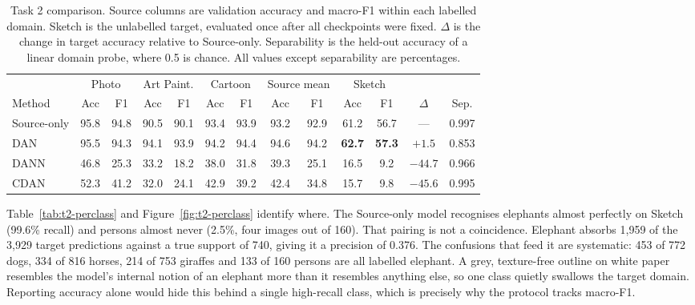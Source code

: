 \begin{table}[t]
\centering
\caption{Task 2 comparison. Source columns are validation accuracy and macro-F1
within each labelled domain. Sketch is the unlabelled target, evaluated once
after all checkpoints were fixed. $\Delta$ is the change in target accuracy
relative to Source-only. Separability is the held-out accuracy of a linear domain
probe, where 0.5 is chance. All values except separability are percentages.}
\label{tab:t2-main}
\small
\setlength{\tabcolsep}{4pt}
\begin{tabular}{lcccccccccccc}
\toprule
& \multicolumn{2}{c}{Photo} & \multicolumn{2}{c}{Art Paint.} & \multicolumn{2}{c}{Cartoon}
& \multicolumn{2}{c}{Source mean} & \multicolumn{2}{c}{Sketch} & &  \\
\cmidrule(lr){2-3}\cmidrule(lr){4-5}\cmidrule(lr){6-7}\cmidrule(lr){8-9}\cmidrule(lr){10-11}
Method & Acc & F1 & Acc & F1 & Acc & F1 & Acc & F1 & Acc & F1 & $\Delta$ & Sep. \\
\midrule
Source-only & 95.8 & 94.8 & 90.5 & 90.1 & 93.4 & 93.9 & 93.2 & 92.9 & 61.2 & 56.7 & --- & 0.997 \\
DAN         & 95.5 & 94.3 & 94.1 & 93.9 & 94.2 & 94.4 & 94.6 & 94.2 & \textbf{62.7} & \textbf{57.3} & $+1.5$ & 0.853 \\
DANN        & 46.8 & 25.3 & 33.2 & 18.2 & 38.0 & 31.8 & 39.3 & 25.1 & 16.5 & 9.2 & $-44.7$ & 0.966 \\
CDAN        & 52.3 & 41.2 & 32.0 & 24.1 & 42.9 & 39.2 & 42.4 & 34.8 & 15.7 & 9.8 & $-45.6$ & 0.995 \\
\bottomrule
\end{tabular}
\end{table}

Table~\ref{tab:t2-perclass} and Figure~\ref{fig:t2-perclass} identify where.
The Source-only model recognises elephants almost perfectly on Sketch (99.6\%
recall) and persons almost never (2.5\%, four images out of 160). That pairing is
not a coincidence. Elephant absorbs 1{,}959 of the 3{,}929 target predictions
against a true support of 740, giving it a precision of 0.376. The confusions
that feed it are systematic: 453 of 772 dogs, 334 of 816 horses, 214 of 753
giraffes and 133 of 160 persons are all labelled elephant. A grey, texture-free
outline on white paper resembles the model's internal notion of an elephant more
than it resembles anything else, so one class quietly swallows the target domain.
Reporting accuracy alone would hide this behind a single high-recall class, which
is precisely why the protocol tracks macro-F1.

